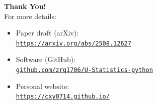 \documentclass[9pt]{beamer}
\theoremstyle{mystyle}
\theoremstyle{mystyletwo}
\def\[{\left[}
\def\[{\left[}
\begin{document}
\begin{frame}
\frametitle{}
    \centering
    \vspace{2cm}
    {\Huge \textbf{Thank You!}} \\[1.5em]

    {\large For more details:} \\[1em]

    \begin{itemize}\setlength\itemsep{0.8em}
        \item Paper draft (arXiv): \\
        \href{https://arxiv.org/abs/2508.12627}{\texttt{https://arxiv.org/abs/2508.12627}}
        
        \item Software (GitHub): \\
        \href{https://github.com/zrq1706/U-Statistics-python}{\texttt{github.com/zrq1706/U-Statistics-python}}
        
        \item Personal website: \\
        \href{https://cxy0714.github.io/}{\texttt{https://cxy0714.github.io/}}
    \end{itemize}

    \vfill
\end{frame}
\end{document}
